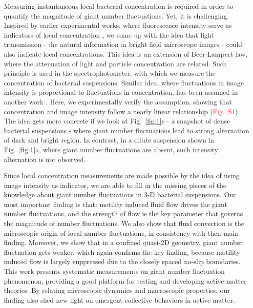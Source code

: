 \documentclass[twocolumn,aps,pre,amsmath,amssymb,floatfix,longbibliography]{revtex4-1}
\begin{document}
Measuring instantaneous local bacterial concentration is required in order to quantify the magnitude of giant number fluctuations. Yet, it is challenging. Inspired by earlier experimental works, where fluorescence intensity serve as indicators of local concentration \cite{Schaller4488}, we come up with the idea that light transmission - the natural information in bright field microscope images - could also indicate local concentrations. This idea is an extension of Beer-Lampert law, where the attenuation of light and particle concentration are related. Such principle is used in the spectrophotometer, with which we measure the concentration of bacterial suspensions. Similar idea, where fluctuations in image intensity is proportional to fluctuations in concentration, has been assumed in another work \cite{PhysRevLett.106.018101}. Here, we experimentally verify the assumption, showing that concentration and image intensity follow a nearly linear relationship (\textcolor{red}{Fig.~S1}). The idea gets more concrete if we look at Fig.~\ref{fig:1}c - a snapshot of dense bacterial suspensions - where giant number fluctuations lead to strong alternation of dark and bright region. In contrast, in a dilute suspension shown in Fig.~\ref{fig:1}a, where giant number fluctuations are absent, such intensity alternation is not observed.

Since local concentration measurements are made possible by the idea of using image intensity as indicator, we are able to fill in the missing pieces of the knowledge about giant number fluctuations in 3-D bacterial suspensions. Our most important finding is that: motility induced fluid flow drives the giant number fluctuations, and the strength of flow is the key parameter that governs the magnitude of number fluctuations. We also show that fluid convection is the microscopic origin of local number fluctuations, in consistency with then main finding. Moreover, we show that in a confined quasi-2D geometry, giant number fluctuation gets weaker, which again confirms the key finding, because motility induced flow is largely suppressed due to the closely spaced no-slip boundaries. This work presents systematic measurements on giant number fluctuation phenomenon, providing a good platform for testing and developing active matter theories. By relating microscopic dynamics and macroscopic properties, our finding also shed new light on emergent collective behaviors in active matter.
%
\end{document}
